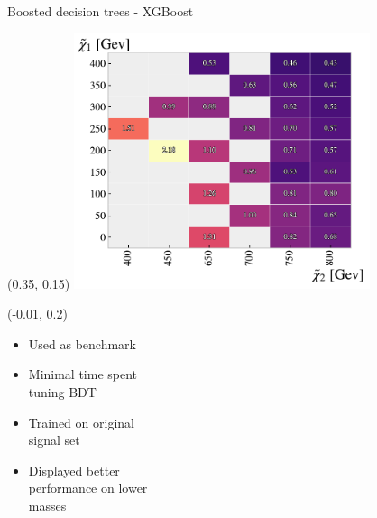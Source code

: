 \documentclass[UKenglish]{beamer}
\begin{document}
\begin{frame}{Boosted decision trees - XGBoost}
    \begin{textblock}{1}(0.35, 0.15)
        \includegraphics[width=0.65\textwidth]{figures/grids/XGBGridSig.pdf}    
    \end{textblock}
    \begin{textblock}{1}(-0.01, 0.2)
        \begin{itemize}
            \item Used as benchmark
            \item Minimal time spent\\ tuning BDT
            \item Trained on original \\ signal set
            \item Displayed better\\ performance on lower \\masses  
        \end{itemize}
    \end{textblock}
\end{frame}

\end{document}
